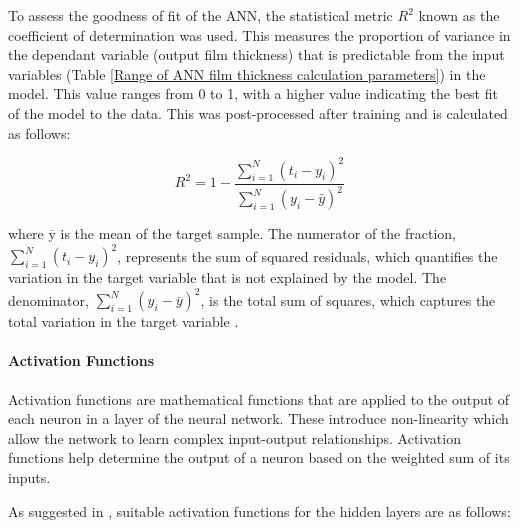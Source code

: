 To assess the goodness of fit of the ANN, the statistical metric $R^2$ known as the coefficient of determination was used. This measures the proportion of variance in the dependant variable (output film thickness) that is predictable from the input variables (Table \ref{Range of ANN film thickness calculation parameters}) in the model. This value ranges from 0 to 1, with a higher value indicating the best fit of the model to the data. This was post-processed after training and is calculated as follows:

\begin{equation}\label{R-squared}
	R^2=1-\frac{\sum_{i=1}^N\left(t_i-y_i\right)^2}{\sum_{i=1}^N\left(y_i-\bar{y}\right)^2}
\end{equation}

 where $\overline{\mathrm{y}}$ is the mean of the target sample. The numerator of the fraction, \( \sum_{i=1}^N(t_i - y_i)^2 \), represents the sum of squared residuals, which quantifies the variation in the target variable that is not explained by the model. The denominator, \( \sum_{i=1}^N(y_i - \bar{y})^2 \), is the total sum of squares, which captures the total variation in the target variable \cite{Marian2022}.

\paragraph{Activation Functions}

Activation functions are mathematical functions that are applied to the output of each neuron in a layer of the neural network. These introduce non-linearity which allow the network to learn complex input-output relationships. Activation functions help determine the  output of a neuron based on the weighted sum of its inputs.

As suggested in \cite{Marian2022}, suitable activation functions for the hidden layers are as follows:

